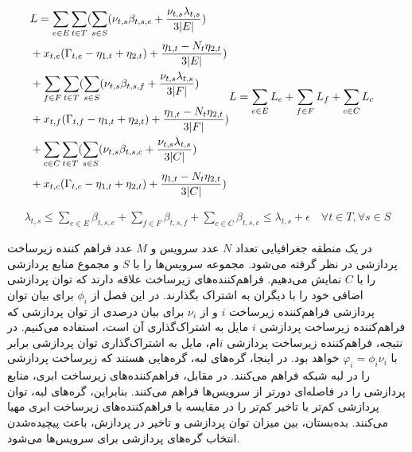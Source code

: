 	\begin{subequations}
		\begin{align}
		& \notag L = \sum_{e \in E}\sum_{t \in T}(\sum_{s \in S}(\nu_{t,s}\beta_{t,s,e}+\frac{\nu_{t,s}\lambda_{t,s}}{3|E|}) \\
		&\notag + x_{t,e}(\Gamma_{t,e}-\eta_{1,t}+\eta_{2,t})+\frac{\eta_{1,t}-N_t\eta_{2,t}}{3|E|}) \\
		& \notag + \sum_{f \in F}\sum_{t \in T}(\sum_{s \in S}(\nu_{t,s}\beta_{t,s,f}+\frac{\nu_{t,s}\lambda_{t,s}}{3|F|}) \\
		& \notag + x_{t,f}(\Gamma_{t,f}-\eta_{1,t}+\eta_{2,t})+\frac{\eta_{1,t}-N_t\eta_{2,t}}{3|F|}) \\
		& \notag + \sum_{c \in C}\sum_{t \in T}(\sum_{s \in S}(\nu_{t,s}\beta_{t,s,c}+\frac{\nu_{t,s}\lambda_{t,s}}{3|C|}) \\
		&+ x_{t,c}(\Gamma_{t,c}-\eta_{1,t}+\eta_{2,t})+\frac{\eta_{1,t}-N_t\eta_{2,t}}{3|C|})
		\end{align}
		\begin{align}
		& L = \sum_{e \in E}L_e + \sum_{f \in F}L_f + \sum_{c \in C}L_c
		\end{align}
	\end{subequations}


	\begin{align}
		\lambda_{t,s} \le \sum_{e \in E} \beta_{t,s,e} + \sum_{f \in F} \beta_{t,s,f}
		+\sum_{c \in C}\beta_{t,s,c} \le \lambda_{t,s}+\epsilon \quad \forall{t \in T}, \forall{s \in S}
	\end{align}
    
    
    

    در یک منطقه جغرافیایی تعداد $N$ عدد سرویس و $M$ عدد فراهم کننده زیرساخت پردازشی در نظر گرفته می‌شود.
    مجموعه سرویس‌ها را با $S$ و مجموع منابع پردازشی را با $C$ نمایش می‌دهیم.
    فراهم‌کننده‌های زیرساخت علاقه دارند که توان پردازشی اضافی خود را با دیگران به اشتراک بگذارند.
    در این فصل از $\phi_i$ برای بیان توان پردازشی فراهم‌کننده زیرساخت $i$ و از $\nu_i$ برای بیان درصدی از توان پردازشی که فراهم‌کننده زیرساخت پردازشی $i$ مایل به اشتراک‌گذاری آن است، استفاده می‌کنیم.
    در نتیجه، فراهم‌کننده زیرساخت پردازشی $i$ام، مایل به اشتراک‌گذاری توان پردازشی برابر با $\varphi_i = \phi_i \nu_i$ خواهد بود.
    در اینجا، گره‌های لبه، گره‌هایی هستند که زیرساخت پردازشی را در لبه شبکه فراهم می‌کنند.
    در مقابل، فراهم‌کننده‌های زیرساخت ابری، منابع پردازشی را در فاصله‌ای دورتر از سرویس‌ها فراهم می‌کنند.
    بنابراین،‌ گره‌های لبه، توان پردازشی کم‌تر با تاخیر کم‌تر را در مقایسه با فراهم‌کننده‌های زیرساخت ابری مهیا می‌کنند.
    بده‌بستان، بین میزان توان پردازشی و تاخیر در پردازش، باعث پیچیده‌شدن انتخاب گره‌های پردازشی برای سرویس‌ها می‌شود.
    
